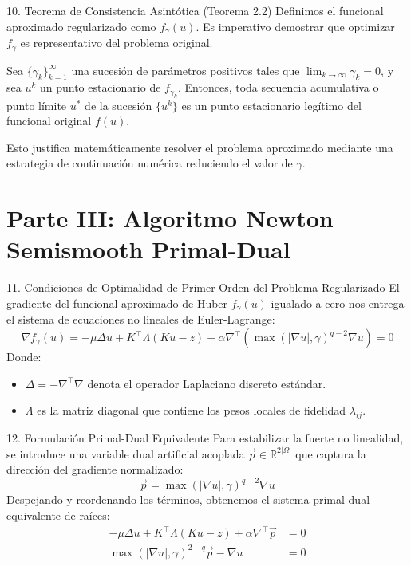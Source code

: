 \documentclass[aspectratio=169,11pt]{beamer}
\begin{document}
\begin{frame}{10. Teorema de Consistencia Asintótica (Teorema 2.2)}
    Definimos el funcional aproximado regularizado como $f_\gamma(u)$. Es imperativo demostrar que optimizar $f_\gamma$ es representativo del problema original.
    \begin{theorem}[Consistencia]
        Sea $\{\gamma_k\}_{k=1}^\infty$ una sucesión de parámetros positivos tales que $\lim_{k\to\infty} \gamma_k = 0$, y sea $u^k$ un punto estacionario de $f_{\gamma_k}$. Entonces, toda secuencia acumulativa o punto límite $u^*$ de la sucesión $\{u^k\}$ es un punto estacionario legítimo del funcional original $f(u)$.
    \end{theorem}
    Esto justifica matemáticamente resolver el problema aproximado mediante una estrategia de continuación numérica reduciendo el valor de $\gamma$.
\end{frame}

\section{Parte III: Algoritmo Newton Semismooth Primal-Dual}

\begin{frame}{11. Condiciones de Optimalidad de Primer Orden del Problema Regularizado}
    El gradiente del funcional aproximado de Huber $f_\gamma(u)$ igualado a cero nos entrega el sistema de ecuaciones no lineales de Euler-Lagrange:
    \begin{equation}
        \nabla f_\gamma(u) = -\mu \Delta u + K^\top \Lambda (Ku - z) + \alpha \nabla^\top \left( \max(|\nabla u|, \gamma)^{q-2} \nabla u \right) = 0
    \end{equation}
    Donde:
    \begin{itemize}
        \item $\Delta = -\nabla^\top \nabla$ denota el operador Laplaciano discreto estándar.
        \item $\Lambda$ es la matriz diagonal que contiene los pesos locales de fidelidad $\lambda_{ij}$.
    \end{itemize}
\end{frame}

\begin{frame}{12. Formulación Primal-Dual Equivalente}
    Para estabilizar la fuerte no linealidad, se introduce una variable dual artificial acoplada $\vec{p} \in \mathbb{R}^{2|\Omega|}$ que captura la dirección del gradiente normalizado:
    \begin{equation}
        \vec{p} = \max(|\nabla u|, \gamma)^{q-2} \nabla u
    \end{equation}
    Despejando y reordenando los términos, obtenemos el sistema primal-dual equivalente de raíces:
    \begin{align}
        -\mu \Delta u + K^\top \Lambda (Ku - z) + \alpha \nabla^\top \vec{p} &= 0 \\
        \max(|\nabla u|, \gamma)^{2-q} \vec{p} - \nabla u &= 0
    \end{align}
\end{frame}
\end{document}
